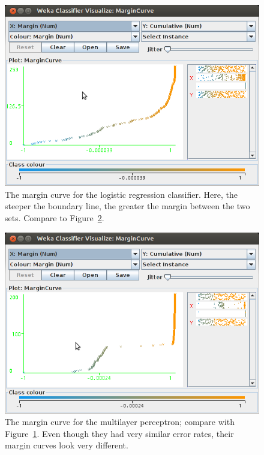 \documentclass{amsart}
\begin{document}
	\begin{figure}
	\centering
	\label{logistic}
	\includegraphics[width=6in]{logistic_regression}
	\caption{The margin curve for the logistic regression classifier. Here, the steeper the boundary line, the greater the margin between the two sets. Compare to Figure~\ref{multilayer}.}
	\end{figure}
	\begin{figure}
	\centering
	\label{multilayer}
	\includegraphics[width=6in]{multilayer_perceptron}
	\caption{The margin curve for the multilayer perceptron; compare with Figure~\ref{logistic}. Even though they had very similar error rates, their margin curves look very different.}
	\end{figure}
	
\end{document}
